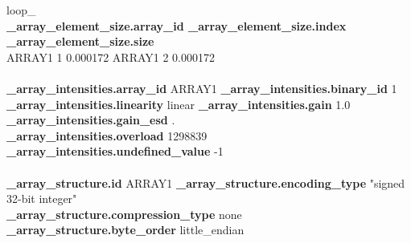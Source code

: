 \documentclass[11pt]{a0poster}
\begin{document}
\begin{minipage}[]{0.29\linewidth}
loop\_\\
{\bf \_array\_element\_size.array\_id  \_array\_element\_size.index  \_array\_element\_size.size}\\
 ARRAY1 1 0.000172   ARRAY1 2 0.000172\\
\\
{\bf \_array\_intensities.array\_id} ARRAY1  {\bf \_array\_intensities.binary\_id} 1\\
{\bf \_array\_intensities.linearity} linear  {\bf \_array\_intensities.gain} 1.0  {\bf \_array\_intensities.gain\_esd} .\\
{\bf \_array\_intensities.overload} 1298839  {\bf \_array\_intensities.undefined\_value} -1\\
\\
{\bf \_array\_structure.id} ARRAY1  {\bf \_array\_structure.encoding\_type} "signed 32-bit integer"\\
{\bf \_array\_structure.compression\_type} none  {\bf \_array\_structure.byte\_order} little\_endian\\

\end{minipage}%
\end{document}
